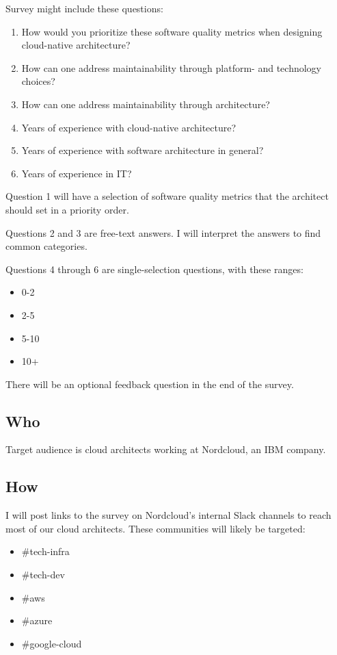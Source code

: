 \documentclass[utf8,english]{gradu3}
\begin{document}
Survey might include these questions:
\begin{enumerate}
  \item How would you prioritize these software quality metrics when designing cloud-native
        architecture?
  \item How can one address maintainability through platform- and technology choices?
  \item How can one address maintainability through architecture?
  \item Years of experience with cloud-native architecture?
  \item Years of experience with software architecture in general?
  \item Years of experience in IT?
\end{enumerate}

Question 1 will have a selection of software quality metrics that the architect should set in a priority order.

Questions 2 and 3 are free-text answers.
I will interpret the answers to find common categories.

Questions 4 through 6 are single-selection questions, with these ranges:
\begin{itemize}
  \item 0-2
  \item 2-5
  \item 5-10
  \item 10+
\end{itemize}

There will be an optional feedback question in the end of the survey.

\subsection{Who}

Target audience is cloud architects working at Nordcloud, an IBM company.

\subsection{How}
I will post links to the survey on Nordcloud's internal Slack channels to reach
most of our cloud architects.
These communities will likely be targeted:
\begin{itemize}
  \item \#tech-infra
  \item \#tech-dev
  \item \#aws
  \item \#azure
  \item \#google-cloud
\end{itemize}
\end{document}
